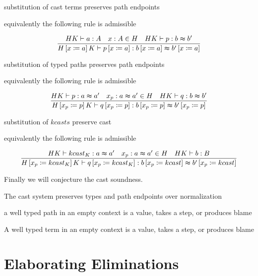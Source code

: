 \begin{conjecture}
substitution of cast terms preserves path endpoints

equivalently the following rule is admissible

\[
\frac{HK\vdash a:A\quad x:A\in H\quad HK\vdash p:b\thickapprox b'}{H\left[x\coloneqq a\right]K\vdash p\left[x\coloneqq a\right]:b\left[x\coloneqq a\right]\thickapprox b'\left[x\coloneqq a\right]}
\]
\end{conjecture}

\begin{conjecture}
substitution of typed paths preserves path endpoints

equivalently the following rule is admissible

\[
\frac{HK\vdash p:a\thickapprox a'\quad x_{p}:a\thickapprox a'\in H\quad HK\vdash q:b\thickapprox b'}{H\left[x_{p}\coloneqq p\right]K\vdash q\left[x_{p}\coloneqq p\right]:b\left[x_{p}\coloneqq p\right]\thickapprox b'\left[x_{p}\coloneqq p\right]}
\]
\end{conjecture}

\begin{conjecture}
substitution of $kcasts$ preserve cast

equivalently the following rule is admissible

\[
\frac{HK\vdash kcast_{K}:a\thickapprox a'\quad x_{p}:a\thickapprox a'\in H\quad HK\vdash b:B}{H\left[x_{p}\coloneqq kcast_{K}\right]K\vdash q\left[x_{p}\coloneqq kcast_{K}\right]:b\left[x_{p}\coloneqq kcast\right]\thickapprox b'\left[x_{p}\coloneqq kcast\right]}
\]
\end{conjecture}


Finally we will conjecture the cast soundness.
\begin{conjecture}
The cast system preserves types and path endpoints over normalization
\end{conjecture}

\begin{conjecture}
a well typed path in an empty context is a value, takes a step, or
produces blame
\end{conjecture}

\begin{conjecture}
A well typed term in an empty context is a value, takes a step, or
produces blame
\end{conjecture}


\section{Elaborating Eliminations}

